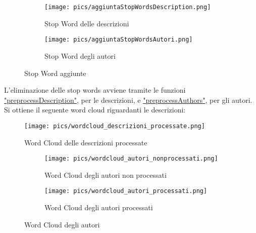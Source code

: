 \documentclass[12pt,oneside]{article}
\begin{document}
\begin{enumerate}
    \begin{figure}[H]
    \begin{subfigure}{0.10\textwidth}
    \texttt{[image: pics/aggiuntaStopWordsDescription.png]} 
    \begin{justify}
    \caption{Stop Word delle descrizioni}  
    \end{justify}
    \label{fig:subim1}
    \end{subfigure}
    \hspace{3cm}
    \begin{subfigure}{0.11\textwidth}
    \texttt{[image: pics/aggiuntaStopWordsAutori.png]}
    \begin{justify}
    \caption{Stop Word degli autori}   
    \end{justify}
    \label{fig:subim2}
    \end{subfigure}
    \caption{Stop Word aggiunte}
    \end{figure}

    \newpage
    \begin{justify}
    L'eliminazione delle stop words avviene tramite le funzioni \hyperlink{preD}{"preprocessDescription"}, per le descrizioni, e \hyperlink{preA}{"preprocessAuthors"}, per gli autori. Si ottiene il seguente word cloud riguardanti le descrizioni:
    \end{justify}
    \begin{figure}[H]
    \centering
    \texttt{[image: pics/wordcloud\_descrizioni\_processate.png]}
    \caption{Word Cloud delle descrizioni processate}
    \end{figure}

    \hfill
    \hfill
    \begin{figure}[H]
    \begin{subfigure}{0.48\textwidth}
    \texttt{[image: pics/wordcloud\_autori\_nonprocessati.png]} 
    \caption{Word Cloud degli autori non processati}
    \label{fig:subim1}
    \end{subfigure}
    \begin{subfigure}{0.48\textwidth}
    \texttt{[image: pics/wordcloud\_autori\_processati.png]}
    \caption{Word Cloud degli autori processati}
    \label{fig:subim2}
    \end{subfigure}
    \caption{Word Cloud degli autori}
    \end{figure}
    \end{enumerate}
\end{document}
